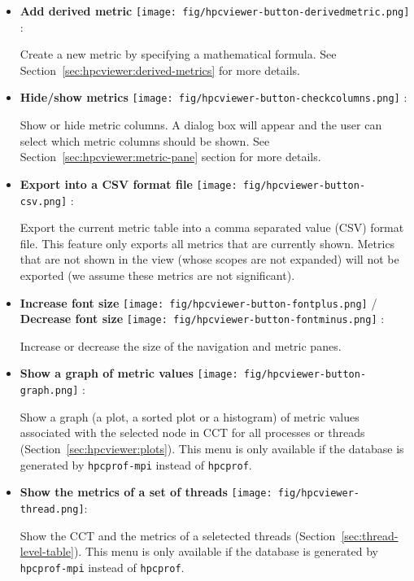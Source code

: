 \begin{itemize}
\item \textbf{Add derived metric} \texttt{[image: fig/hpcviewer-button-derivedmetric.png]} :

Create a new metric by specifying a mathematical formula.
See Section~\ref{sec:hpcviewer:derived-metrics} for more details.

\item \textbf{Hide/show metrics} \texttt{[image: fig/hpcviewer-button-checkcolumns.png]} :

Show or hide metric columns.
A dialog box will appear and the user can select which metric columns should be shown.
See Section~\ref{sec:hpcviewer:metric-pane} section for more details.

\item \textbf{Export into a CSV format file} \texttt{[image: fig/hpcviewer-button-csv.png]} :

Export the current metric table into a comma separated value (CSV) format file.
This feature only exports all metrics that are currently shown.
Metrics that are not shown in the view (whose scopes are not expanded) will not be exported (we assume these metrics are not significant).

\item \textbf{Increase font size} \texttt{[image: fig/hpcviewer-button-fontplus.png]} /
      \textbf{Decrease font size} \texttt{[image: fig/hpcviewer-button-fontminus.png]} :

Increase or decrease the size of the navigation and metric panes.

\item \textbf{Show a graph of metric values} \texttt{[image: fig/hpcviewer-button-graph.png]} :

Show a graph (a plot, a sorted plot or a histogram) of metric values associated with the selected node in CCT for all processes or threads (Section~\ref{sec:hpcviewer:plots}). 
This menu is only available if the database is generated by \texttt{hpcprof-mpi} instead of \texttt{hpcprof}. 

\item \textbf{Show the metrics of a set of threads} \texttt{[image: fig/hpcviewer-thread.png]}:

Show the CCT and the metrics of a seletected threads  (Section~\ref{sec:thread-level-table}). 
This menu is only available if the database is generated by \texttt{hpcprof-mpi} instead of \texttt{hpcprof}. 
 
\end{itemize}


